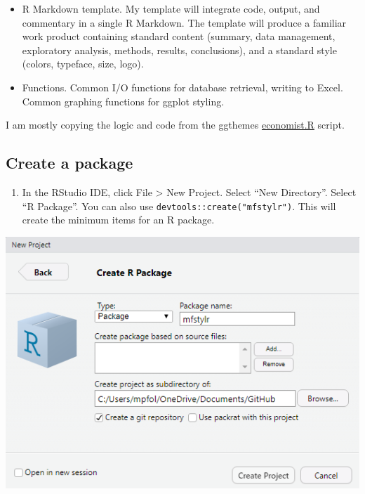 \documentclass[
]{book}
\providecommand{\tightlist}{%
  \setlength{\itemsep}{0pt}\setlength{\parskip}{0pt}}
\begin{document}
\begin{itemize}
\item
  R Markdown template. My template will integrate code, output, and commentary in a single R Markdown. The template will produce a familiar work product containing standard content (summary, data management, exploratory analysis, methods, results, conclusions), and a standard style (colors, typeface, size, logo).
\item
  Functions. Common I/O functions for database retrieval, writing to Excel. Common graphing functions for ggplot styling.
\end{itemize}

I am mostly copying the logic and code from the ggthemes \href{https://rdrr.io/cran/ggthemes/src/R/economist.R}{economist.R} script.

\hypertarget{create-a-package}{%
\subsection*{Create a package}\label{create-a-package}}

\begin{enumerate}
\def\labelenumi{\arabic{enumi}.}
\tightlist
\item
  In the RStudio IDE, click File \textgreater{} New Project. Select ``New Directory''. Select ``R Package''. You can also use \texttt{devtools::create("mfstylr")}. This will create the minimum items for an R package.
\end{enumerate}

\includegraphics{./images/create_pkg.png}
\end{document}
